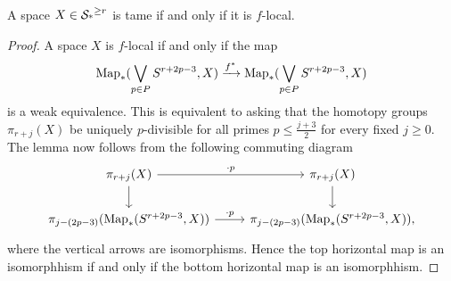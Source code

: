 \begin{lemma}
\label{tame is equivalent to f-local}
	A space $X\in \operatorname{\mathcal{S}_{*}}^{\geq r}$ is tame if and only if it is $f$-local.
\end{lemma}
\begin{proof}
	A space $X$ is $f$-local if and only if the map
	\[
	\operatorname{Map}_{*}(\bigvee_{p\in P}S^{r+2p-3},X) \xrightarrow{f^*} \operatorname{Map}_{*}(\bigvee_{p\in P}S^{r+2p-3},X)
	\]
	is a weak equivalence. This is equivalent to asking that the homotopy groups $\pi_{r+j}(X)$ be uniquely $p$-divisible for all primes $p\leq \frac{j+3}{2}$ for every fixed $j\geq 0$. 	The lemma now follows from the following commuting diagram
	\[	
	\begin{tikzcd}
		\pi_{r+j}(X) & \pi_{r+j}(X)\\
		\pi_{j-(2p-3)}(\map_*(S^{r+2p-3},X)) & \pi_{j-(2p-3)}(\map_*(S^{r+2p-3},X)),
		\arrow[from=1-1, to=1-2,"\cdot p"]
		\arrow[from=2-1, to=2-2,"\cdot p"]
		\arrow[from=1-1, to=2-1]
		\arrow[from=1-2, to=2-2]
	\end{tikzcd}
	\]
	where the vertical arrows are isomorphisms. Hence the top horizontal map is an isomorphhism if and only if the bottom horizontal map is an isomorphhism.
	
\end{proof}

